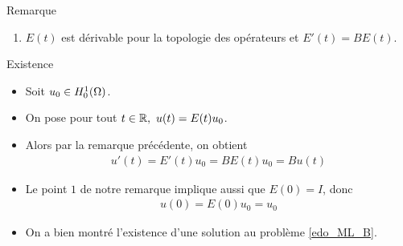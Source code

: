 \begin{frame}
\begin{block}{Remarque}
\begin{enumerate}
        \item[3.] $E(t)$ est dérivable pour la topologie des opérateurs et $E'(t) = B E(t)$. %
    \end{enumerate}
    \end{block}
\end{frame}

\begin{frame}{Existence}
    \begin{itemize}
        \item Soit $u_0 \in H^1_0(\Omega)$.
        \item On pose pour tout $t \in \mathbb{R},\ u(t) = E(t)u_0$. 
        \item Alors par la remarque précédente, on obtient
\begin{eqnarray*}
    u'(t) = E'(t)u_0 = B E(t)u_0 = Bu(t)
\end{eqnarray*} 
\item Le point $1$ de notre remarque implique aussi que $E(0) = I$, donc
\begin{eqnarray*}
    u(0) = E(0)u_0 = u_0
\end{eqnarray*} 
\item On a bien montré l'existence d'une solution au problème \eqref{edo_ML_B}. 
    \end{itemize}
\end{frame}

